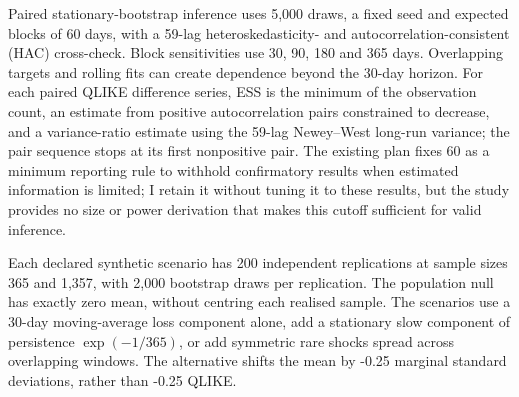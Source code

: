 \documentclass[10pt,a4paper]{article}
\newcommand{\HorizonDays}{30}
\newcommand{\MinimumEffectiveN}{60}
\newcommand{\BootstrapDraws}{5{,}000}
\newcommand{\ExpectedBlockDays}{60}
\newcommand{\HACLags}{59}
\newcommand{\SensitivityThirtyDays}{30}
\newcommand{\SensitivityNinetyDays}{90}
\newcommand{\SensitivityOneEightyDays}{180}
\newcommand{\SensitivityYearDays}{365}
\newcommand{\SimulationReplications}{200}
\newcommand{\SimulationShortN}{365}
\newcommand{\SimulationLongNGrouped}{1{,}357}
\newcommand{\SimulationBootstrapDraws}{2{,}000}
\newcommand{\NegativeUnit}{-1}
\newcommand{\PersistenceDays}{365}
\newcommand{\AlternativeShift}{-0.25}
\begin{document}
Paired stationary-bootstrap inference uses \BootstrapDraws{} draws, a fixed seed and expected blocks of \ExpectedBlockDays{} days, with a \HACLags{}-lag heteroskedasticity- and autocorrelation-consistent (HAC) cross-check. Block sensitivities use \SensitivityThirtyDays{}, \SensitivityNinetyDays{}, \SensitivityOneEightyDays{} and \SensitivityYearDays{} days. Overlapping targets and rolling fits can create dependence beyond the \HorizonDays{}-day horizon. For each paired QLIKE difference series, ESS is the minimum of the observation count, an estimate from positive autocorrelation pairs constrained to decrease, and a variance-ratio estimate using the \HACLags{}-lag Newey--West long-run variance; the pair sequence stops at its first nonpositive pair. The existing plan fixes \MinimumEffectiveN{} as a minimum reporting rule to withhold confirmatory results when estimated information is limited; I retain it without tuning it to these results, but the study provides no size or power derivation that makes this cutoff sufficient for valid inference.

Each declared synthetic scenario has \SimulationReplications{} independent replications at sample sizes \SimulationShortN{} and \SimulationLongNGrouped{}, with \SimulationBootstrapDraws{} bootstrap draws per replication. The population null has exactly zero mean, without centring each realised sample. The scenarios use a \HorizonDays{}-day moving-average loss component alone, add a stationary slow component of persistence $\exp(\NegativeUnit{}/\PersistenceDays{})$, or add symmetric rare shocks spread across overlapping windows. The alternative shifts the mean by \AlternativeShift{} marginal standard deviations, rather than \AlternativeShift{} QLIKE.
\end{document}
